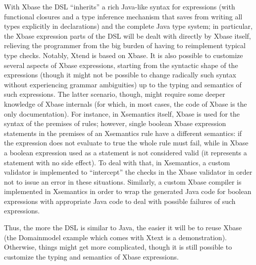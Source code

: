 With Xbase the DSL ``inherits'' a rich Java-like syntax for expressions (with
functional closures and a type inference mechanism that saves from writing all
types explicitly in declarations) and the complete Java type system; in
particular, the Xbase expression parts of the DSL will be dealt with directly by Xbase itself, relieving the programmer from the big burden of having to reimplement typical type checks.
Notably, Xtend is based on Xbase.
It is also possible to customize
several aspects of Xbase expressions, starting from the syntactic shape of the
expressions (though it might not be possible to change radically such syntax
without experiencing grammar ambiguities) up to the typing and semantics of such
expressions.  The latter scenario, though, might require some deeper knowledge
of Xbase internals (for which, in most cases, the code of Xbase is the only
documentation).  For instance, in Xsemantics itself, Xbase is used for the
syntax of the premises of rules; however, single boolean Xbase expression
statements in the premises of an Xsemantics rule have a different semantics: if
the expression does not evaluate to true the whole rule must fail, while in
Xbase a boolean expression used as a statement is not considered valid (it
represents a statement with no side effect).  To deal with that, in Xsemantics,
a custom validator is implemented to ``intercept'' the checks in the Xbase
validator in order not to issue an error in these situations.
Similarly, a custom Xbase compiler is implemented in Xsemantics in order to wrap
the generated Java code for boolean expressions with appropriate Java code to
deal with possible failures of such expressions.

Thus, the more the DSL is similar to Java, the easier it will be to reuse Xbase
(the Domainmodel example which comes with Xtext is a demonstration).  Otherwise,
things might get more complicated, though it is still possible to customize the
typing and semantics of Xbase expressions.

